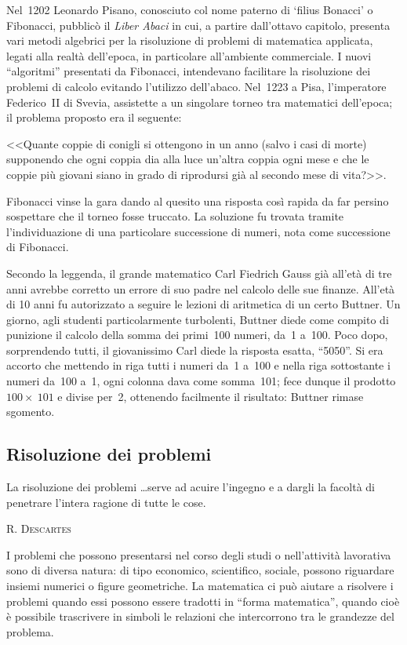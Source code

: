 Nel~1202 Leonardo Pisano, conosciuto col nome paterno di
`filius Bonacci' o Fibonacci, pubblicò il
\emph{Liber Abaci} in cui, a partire dall'ottavo
capitolo, presenta vari metodi algebrici per la risoluzione di problemi
di matematica applicata, legati alla realtà
dell'epoca, in particolare
all'ambiente commerciale. I nuovi
``algoritmi'' presentati da Fibonacci,
intendevano facilitare la risoluzione dei problemi di calcolo evitando
l'utilizzo dell'abaco. Nel~1223 a
Pisa, l'imperatore Federico~II di Svevia, assistette a
un singolare torneo tra matematici dell'epoca; il
problema proposto era il seguente:

<<Quante coppie di conigli si ottengono in un anno (salvo i
casi di morte) supponendo che ogni coppia dia alla luce
un'altra coppia ogni mese e che le coppie più
giovani siano in grado di riprodursi già al secondo mese di
vita?>>.

Fibonacci vinse la gara dando al quesito una risposta così rapida da
far persino sospettare che il torneo fosse truccato. La soluzione fu
trovata tramite l'individuazione di una particolare
successione di numeri, nota come successione di Fibonacci.

Secondo la leggenda, il grande matematico Carl Fiedrich Gauss già
all'età di tre anni avrebbe corretto un errore di
suo padre nel calcolo delle sue finanze. All'età di
10 anni fu autorizzato a seguire le lezioni di aritmetica di un certo
Buttner. Un giorno, agli studenti particolarmente turbolenti, Buttner
diede come compito di punizione il calcolo della somma dei primi~100
numeri, da~1 a~100. Poco dopo, sorprendendo tutti, il giovanissimo Carl
diede la risposta esatta, ``5050''.
Si era accorto che mettendo in riga tutti i numeri da~1 a~100 e nella
riga sottostante i numeri da~100 a~1, ogni colonna dava come somma~101;
fece dunque il prodotto~\(100\times~101\) e divise per~2, ottenendo facilmente il
risultato: Buttner rimase sgomento.

\subsection{Risoluzione dei problemi}

 \epigraph{La risoluzione dei problemi \ldots serve ad acuire
 l'ingegno e a dargli la facoltà di penetrare
 l'intera ragione di tutte le cose.}{{\scshape{R. Descartes}}}


I problemi che possono presentarsi nel corso degli studi o
nell'attività lavorativa sono di diversa natura: di
tipo economico, scientifico, sociale, possono riguardare insiemi
numerici o figure geometriche. La matematica ci può aiutare a
risolvere i problemi quando essi possono essere tradotti in
``forma matematica'', quando cioè
è possibile trascrivere in simboli le relazioni che intercorrono
tra le grandezze del problema.

